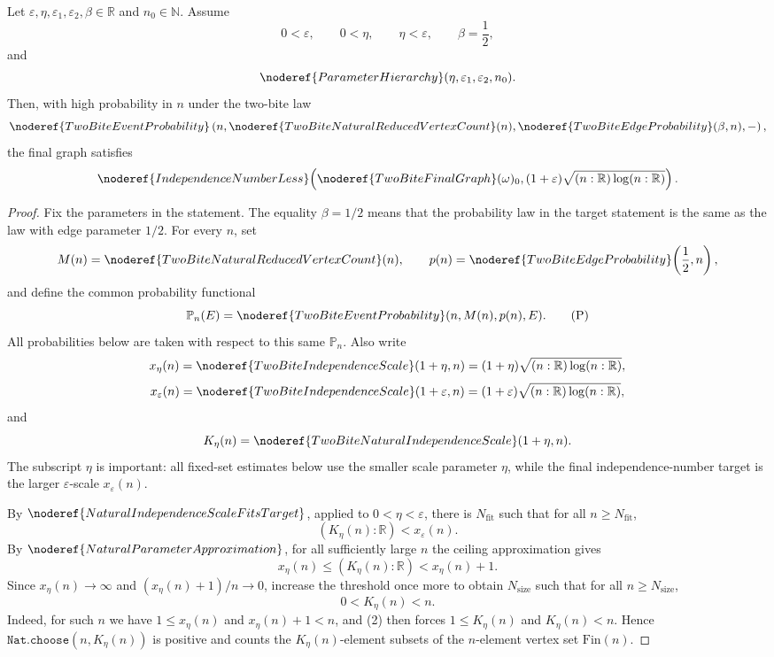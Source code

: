 \begin{lemma}
Let \(\varepsilon,\eta,\varepsilon_1,\varepsilon_2,\beta\in\mathbb R\) and
\(n_0\in\mathbb N\).  Assume
\[
0<\varepsilon,\qquad 0<\eta,\qquad \eta<\varepsilon,\qquad
\beta=\frac12,
\]
and
\[
\noderef{ParameterHierarchy}(\eta,\varepsilon_1,\varepsilon_2,n_0).
\]
Then, with high probability in \(n\) under the two-bite law
\[
\noderef{TwoBiteEventProbability}
\left(n,\noderef{TwoBiteNaturalReducedVertexCount}(n),
\noderef{TwoBiteEdgeProbability}(\beta,n),-\right),
\]
the final graph satisfies
\[
\noderef{IndependenceNumberLess}\!\left(
\noderef{TwoBiteFinalGraph}(\omega)_0,
(1+\varepsilon)\sqrt{(n:\mathbb R)\log(n:\mathbb R)}\right).
\]
\end{lemma}
\begin{proof}
Fix the parameters in the statement.  The equality \(\beta=1/2\) means that
the probability law in the target statement is the same as the law with edge
parameter \(1/2\).  For every \(n\), set
\[
M(n)=\noderef{TwoBiteNaturalReducedVertexCount}(n),\qquad
p(n)=\noderef{TwoBiteEdgeProbability}\!\left(\frac12,n\right),
\]
and define the common probability functional
\[
\mathbb P_n(E)
=\noderef{TwoBiteEventProbability}(n,M(n),p(n),E).
\tag{P}
\]
All probabilities below are taken with respect to this same \(\mathbb P_n\).
Also write
\[
x_\eta(n)=\noderef{TwoBiteIndependenceScale}(1+\eta,n)
=(1+\eta)\sqrt{(n:\mathbb R)\log(n:\mathbb R)},
\]
\[
x_\varepsilon(n)=\noderef{TwoBiteIndependenceScale}(1+\varepsilon,n)
=(1+\varepsilon)\sqrt{(n:\mathbb R)\log(n:\mathbb R)},
\]
and
\[
K_\eta(n)=\noderef{TwoBiteNaturalIndependenceScale}(1+\eta,n).
\]
The subscript \(\eta\) is important: all fixed-set estimates below use the
smaller scale parameter \(\eta\), while the final independence-number target is
the larger \(\varepsilon\)-scale \(x_\varepsilon(n)\).

By \(\noderef{NaturalIndependenceScaleFitsTarget}\), applied to
\(0<\eta<\varepsilon\), there is \(N_{\mathrm{fit}}\) such that for all
\(n\ge N_{\mathrm{fit}}\),
\[
(K_\eta(n):\mathbb R)<x_\varepsilon(n). \tag{1}
\]
By \(\noderef{NaturalParameterApproximation}\), for all sufficiently large \(n\)
the ceiling approximation gives
\[
x_\eta(n)\le (K_\eta(n):\mathbb R)<x_\eta(n)+1.
\tag{2}
\]
Since \(x_\eta(n)\to\infty\) and \((x_\eta(n)+1)/n\to0\), increase the threshold
once more to obtain \(N_{\mathrm{size}}\) such that for all
\(n\ge N_{\mathrm{size}}\),
\[
0<K_\eta(n)<n. \tag{3}
\]
Indeed, for such \(n\) we have \(1\le x_\eta(n)\) and \(x_\eta(n)+1<n\), and
(2) then forces \(1\le K_\eta(n)\) and \(K_\eta(n)<n\).  Hence
\(\texttt{Nat.choose}(n,K_\eta(n))\) is positive and counts the
\(K_\eta(n)\)-element subsets of the \(n\)-element vertex set \(\mathrm{Fin}(n)\).


\end{proof}
